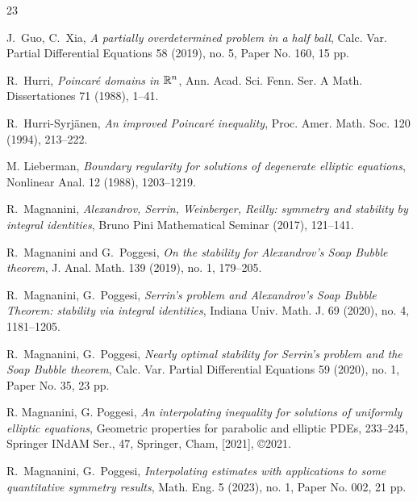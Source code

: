 \documentclass[a4paper,10pt]{amsart}
\numberwithin{equation}{section}
\begin{document}
\begin{thebibliography}{23}


 J.~Guo, C.~Xia,  
\emph{A partially overdetermined problem in a half ball}, Calc. Var. Partial Differential Equations 58 (2019), no. 5, Paper No. 160, 15 pp.

 R.~Hurri, \emph{Poincar\'e domains in $\mathbb{R}^n$}, Ann. Acad. Sci. Fenn. Ser. A Math. Dissertationes 71 (1988), 1--41.

 R.~Hurri-Syrj\"anen, \emph{An improved Poincar\'e inequality}, Proc. Amer. Math. Soc. 120 (1994), 213--222.

 M. Lieberman, \emph{Boundary regularity for solutions of degenerate elliptic equations},
Nonlinear Anal. 12 (1988), 1203--1219.

 R.~Magnanini, \emph{Alexandrov, Serrin, Weinberger, Reilly: symmetry and stability by integral identities}, Bruno Pini Mathematical Seminar (2017), 121--141.

 R.~Magnanini and G.~Poggesi, \emph{On the stability for Alexandrov's Soap Bubble theorem},  J. Anal. Math. 139 (2019), no. 1, 179–205.

 R.~Magnanini, G.~Poggesi, \emph{Serrin's problem and Alexandrov's Soap Bubble Theorem: stability via integral identities},  Indiana Univ. Math. J. 69 (2020), no. 4, 1181–1205. 

 R.~Magnanini, G.~Poggesi, \emph{Nearly optimal stability for Serrin's problem and the Soap Bubble theorem},  Calc. Var. Partial Differential Equations 59 (2020), no. 1, Paper No. 35, 23 pp.

 R. Magnanini, G. Poggesi, \emph{An interpolating inequality for solutions of uniformly elliptic equations}, Geometric properties for parabolic and elliptic PDEs, 233–245, Springer INdAM Ser., 47, Springer, Cham, [2021], ©2021.


 R.~Magnanini, G.~Poggesi, \emph{Interpolating estimates with applications to some quantitative symmetry results}, Math. Eng. 5 (2023), no. 1, Paper No. 002, 21 pp.


\end{thebibliography}
\end{document}
